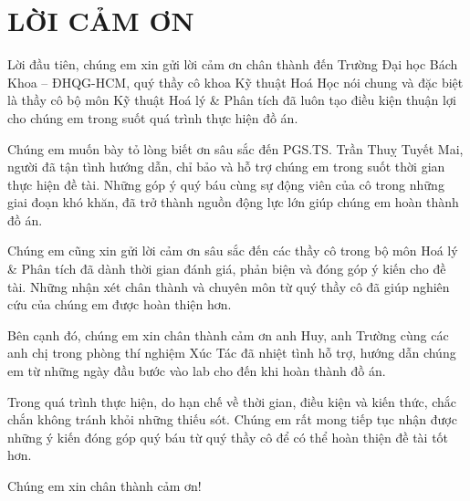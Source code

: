 \documentclass{article} %
\renewcommand{\figurename}{\fontsize{12pt}{0pt}\selectfont \bfseries Hình} %
\renewcommand{\tablename}{\fontsize{12pt}{0pt}\selectfont \bfseries Bảng}
\begin{document}
\section*{LỜI CẢM ƠN}

Lời đầu tiên, chúng em xin gửi lời cảm ơn chân thành đến Trường Đại học Bách Khoa – ĐHQG-HCM, quý thầy cô khoa Kỹ thuật Hoá Học nói chung và đặc biệt là thầy cô bộ môn Kỹ thuật Hoá lý \& Phân tích đã luôn tạo điều kiện thuận lợi cho chúng em trong suốt quá trình thực hiện đồ án.

Chúng em muốn bày tỏ lòng biết ơn sâu sắc đến PGS.TS. Trần Thuỵ Tuyết Mai, người đã tận tình hướng dẫn, chỉ bảo và hỗ trợ chúng em trong suốt thời gian thực hiện đề tài. Những góp ý quý báu cùng sự động viên của cô trong những giai đoạn khó khăn, đã trở thành nguồn động lực lớn giúp chúng em hoàn thành đồ án.

Chúng em cũng xin gửi lời cảm ơn sâu sắc đến các thầy cô trong bộ môn Hoá lý \& Phân tích đã dành thời gian đánh giá, phản biện và đóng góp ý kiến cho đề tài. Những nhận xét chân thành và chuyên môn từ quý thầy cô đã giúp nghiên cứu của chúng em được hoàn thiện hơn.

Bên cạnh đó, chúng em xin chân thành cảm ơn anh Huy, anh Trường cùng các anh chị trong phòng thí nghiệm Xúc Tác đã nhiệt tình hỗ trợ, hướng dẫn chúng em từ những ngày đầu bước vào lab cho đến khi hoàn thành đồ án.

Trong quá trình thực hiện, do hạn chế về thời gian, điều kiện và kiến thức, chắc chắn không tránh khỏi những thiếu sót. Chúng em rất mong tiếp tục nhận được những ý kiến đóng góp quý báu từ quý thầy cô để có thể hoàn thiện đề tài tốt hơn.

Chúng em xin chân thành cảm ơn!

\thispagestyle{empty}
\cleardoublepage

\tableofcontents
\thispagestyle{empty}
\cleardoublepage


{\let\oldnumberline\numberline
\renewcommand{\numberline}{\figurename~\oldnumberline}
\listoffigures}
 {}
\cleardoublepage

{\let\oldnumberline\numberline
\renewcommand{\numberline}{\tablename~\oldnumberline}
\listoftables}
 {}
\cleardoublepage

\end{document}
